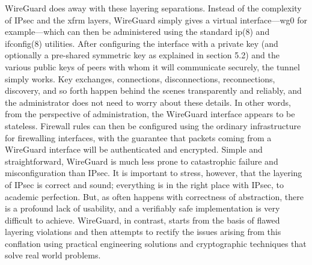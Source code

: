 WireGuard does away with these layering separations. Instead of the complexity of IPsec and the xfrm layers, WireGuard simply gives a virtual interface—wg0 for example—which can then be administered using the standard ip(8) and ifconfig(8) utilities. After configuring the interface with a private key (and optionally a pre-shared symmetric key as explained in section 5.2) and the various public keys of peers with whom it will communicate securely, the tunnel simply works. Key exchanges, connections, disconnections, reconnections, discovery, and so forth happen behind the scenes transparently and reliably, and the administrator does not need to worry about these details. In other words, from the perspective of administration, the WireGuard interface appears to be stateless. Firewall rules can then be configured using the ordinary infrastructure for firewalling interfaces, with the guarantee that packets coming from a WireGuard interface will be authenticated and encrypted. Simple and straightforward, WireGuard is much less prone to catastrophic failure and misconfiguration than IPsec. It is important to stress, however, that the layering of IPsec is correct and sound; everything is in the right place with IPsec, to academic perfection. But, as often happens with correctness of abstraction, there is a profound lack of usability, and a verifiably safe implementation is very difficult to achieve. WireGuard, in contrast, starts from the basis of flawed layering violations and then attempts to rectify the issues arising from this conflation using practical engineering solutions and cryptographic techniques that solve real world problems.

